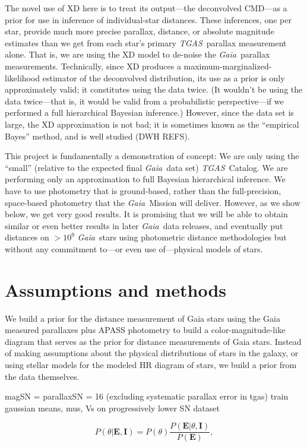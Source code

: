 \documentclass[12pt, preprint]{aastex6}
\newcommand{\acronym}[1]{{\small{#1}}}
\newcommand{\project}[1]{\textsl{#1}}
\newcommand{\tgas}{\project{\acronym{TGAS}}}
\newcommand{\gaia}{\project{Gaia}}
\begin{document}
The novel use of XD here is to treat its output---the deconvolved CMD---as
a prior for use in inference of individual-star distances.
These inferences, one per star, provide much more precise parallax, distance,
or absolute magnitude estimates than we get from each star's primary 
\tgas\ parallax measurement alone.
That is, we are using the XD model to de-noise the \gaia\ parallax
measurements.
Technically, since XD produces a maximum-marginalized-likelihood estimator
of the deconvolved distribution,
its use as a prior is only approximately valid; it constitutes using the
data twice.
(It wouldn't be using the data twice---that is, it would be valid from a
probabilistic perspective---if we performed a full hierarchical Bayesian
inference.)
However, since the data set is large, the XD approximation is not bad; it is
sometimes known as the ``empirical Bayes'' method, and is well studied (DWH REFS).

This project is fundamentally a demonstration of concept:
We are only using the ``small'' (relative to the expected final \gaia\ data set)
\tgas\ Catalog.
We are performing only an approximation to full Bayesian hierarchical inference.
We have to use photometry that is ground-based, rather than the full-precision,
space-based photometry that the \gaia\ Mission will deliver.
However, as we show below, we get very good results.
It is promising that we will be able to obtain similar or even better results
in later \gaia\ data releases, and eventually put distances on $>10^9$
\gaia\ stars using photometric distance methodologies but without any
commitment to---or even use of---physical models of stars.

\section{Assumptions and methods}

We build a prior for the distance measurement of Gaia stars using the Gaia measured parallaxes plus APASS photometry to build a color-magnitude-like diagram that serves as the prior for distance measurements of Gaia stars. Instead of making assumptions about the physical distributions of stars in the galaxy, or using stellar models for the modeled HR diagram of stars, we build a prior from the data themselves.


magSN = parallaxSN = 16 (excluding systematic parallax error in tgas)
train gaussian means, mus, Vs on progressively lower SN dataset

\begin{equation}
\label{eq:bayes}
P(\theta|\textbf{E}, \textbf{I}) = P(\theta ) \frac{P(\textbf{E} |\theta,\textbf{I})}{P(\textbf{E})},
\end{equation}
\end{document}
